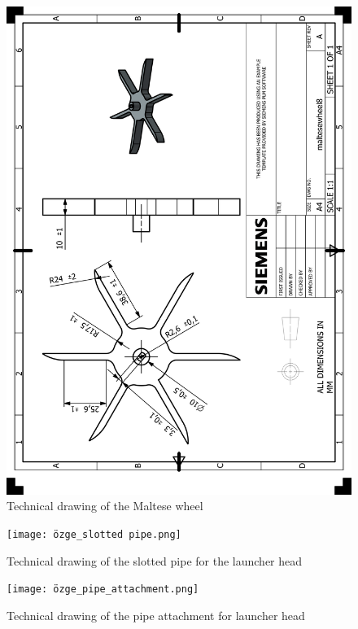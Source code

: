 \documentclass[12pt]{report}
\begin{document}
\begin{appendices}
\begin{figure}[H]
    \centering
    \includegraphics[width=\textwidth]{HP_maltesewheel8.png} 
    \caption{Technical drawing of the Maltese wheel}
    \label{fig:technical-drawing}
\end{figure}

\begin{figure}[H]
    \centering
    \texttt{[image: özge\_slotted pipe.png]} 
    \caption{Technical drawing of the slotted pipe for the launcher head}
    \label{fig:technical-drawing}
\end{figure}

\begin{figure}[H]
    \centering
    \texttt{[image: özge\_pipe\_attachment.png]} 
    \caption{Technical drawing of the pipe attachment for launcher head}
    \label{fig:technical-drawing}
\end{figure}


\end{appendices}
\end{document}
